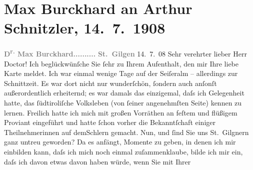 

         
         \renewcommand{\erwaehntePersonen}{Personen: Olga Schnitzler}
         \renewcommand{\erwaehnteOrte}{Orte: Porzellangasse, Seis am Schlern, Seiser Alm, St. Gilgen, Südtirol}
         \renewcommand{\erwaehnteWerke}{}
               \section[Max Burckhard an Arthur Schnitzler, 14. 7. 1908]{ Max Burckhard an Arthur Schnitzler, 14. 7. 1908}\nopagebreak{}\rehead{ }\begin{ledgroupsized}[t]{13cm}\normalsize\beginnumbering \toendnotes[C]{\smallbreak\pagebreak[2]} 
\toendnotes[C]{\smallbreak}\pstart
           \noindent{}{\pb}\textcolor{gray}{\textbf{D\textsuperscript{r.} Max Burckhard}}\hfill \textcolor{gray}{\textbf{..........}}\pend
           \pstart
           \raggedleft{}\textcolor{gray}{\textbf{St. Gilgen}}{ }14. 7. 08\pend
           \pstart{}Sehr verehrter lieber Herr Doctor!\pend\pstart
           Ich beglückwünſche Sie ſehr  zu Ihrem Aufenthalt,
               den mir Ihre liebe Karte meldet. Ich war einmal wenige Tage auf der Seiſeralm – allerdings zur Schnittzeit. Es war
               dort nicht nur wunderſchön, ſondern auch anſonſt außerordentlich erheiternd; es war
               damals das einzigemal, daſs ich Gelegenheit hatte, das ſüdtiroliſche Volksleben (von ſeiner angenehmſten Seite) kennen zu lernen.
               Freilich hatte ich mich mit großen Vorräthen an feſtem und flüßigem Proviant
               eingeführt und hatte ſchon vorher die Bekanntſchaft einiger Theilnehmerinnen auf demSchlern gemacht.\pend
           \pstart
           {\pb}Nun, und ſind Sie uns St. Gilgnern ganz untreu geworden? Da es anfängt, Momente zu
               geben, in denen ich mir einbilden kann, daſs ich mich noch einmal zuſammenklaube,
               bilde ich mir ein, daſs ich davon etwas davon haben würde, wenn Sie mit Ihrer

\end{ledgroupsized}
